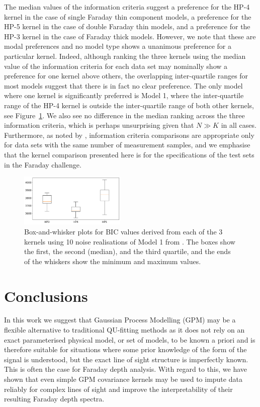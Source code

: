 \documentclass[fleqn,usenatbib]{mnras}
\begin{document}
The median values of the information criteria suggest a preference for the HP-4 kernel in the case of single Faraday thin component models, a preference for the HP-5 kernel in the case of double Faraday thin models, and a preference for the HP-3 kernel in the case of Faraday thick models. However, we note that these are modal preferences and no model type shows a unanimous preference for a particular kernel. Indeed, although ranking the three kernels using the median value of the information criteria for each data set may nominally show a preference for one kernel above others, the overlapping inter-quartile ranges for most models suggest that there is in fact no clear preference. The only model where one kernel is significantly preferred is Model 1, where the inter-quartile range of the HP-4 kernel is outside the inter-quartile range of both other kernels, see Figure~\ref{fig:model1bic}. We also see no difference in the median ranking across the three information criteria, which is perhaps unsurprising given that $N \gg K$ in all cases. Furthermore, as noted by \cite{biccomp}, information criteria comparisons are appropriate only for data sets with the same number of measurement samples, and we emphasise that the kernel comparison presented here is for the specifications of the test sets in the \cite{Sun_2015} Faraday challenge.
%
\begin{figure}
    \centering
    \includegraphics[width=0.45\textwidth]{./FIGURES/model0_info.png}
    \caption{Box-and-whisker plots for BIC values derived from each of the 3 kernels using 10 noise realisations of Model 1 from \protect\cite{Sun_2015}. The boxes show the first, the second (median), and the third quartile, and the ends of the whiskers show the minimum and maximum values.}
    \label{fig:model1bic}
\end{figure}



\section{Conclusions}
\label{sec:conclusions}

In this work we suggest that Gaussian Process Modelling (GPM) may be a flexible alternative to traditional QU-fitting methods as it does not rely on an exact parameterised physical model, or set of models, to be known a priori and is therefore suitable for situations where some prior knowledge of the form of the signal is understood, but the exact line of sight structure is imperfectly known. This is often the case for Faraday depth analysis. With regard to this, we have shown that even simple GPM covariance kernels may be used to impute data reliably for complex lines of sight and improve the interpretability of their resulting Faraday depth spectra.
\end{document}
